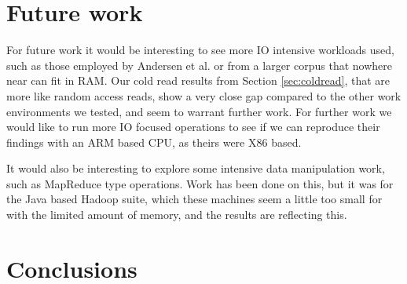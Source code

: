 
\clearpage
\section{Future work}
\label{sec:future}
For future work it would be interesting to see more IO intensive workloads used, such as those employed by Andersen et al.\cite{fawn} or from a larger corpus that nowhere near can fit in RAM.
Our cold read results from Section \ref{sec:coldread}, that are more like random access reads, show a very close gap compared to the other work environments we tested, and seem to warrant further work.
For further work we would like to run more IO focused operations to see if we can reproduce their findings with an ARM based CPU, as theirs were X86 based.

It would also be interesting to explore some intensive data manipulation work, such as MapReduce type operations.
Work has been done on this, but it was for the Java based Hadoop suite, which these machines seem a little too small for with the limited amount of memory, and the results are reflecting this.

\clearpage
\section{Conclusions}
\label{sec:conclusion}
